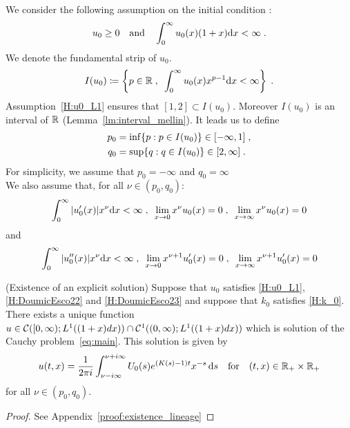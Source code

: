 \documentclass[11pt]{amsart}
\newcommand{\diff}{\,\mathrm{d}}
\begin{document}
    We consider the following assumption on the initial condition : 
    \begin{equation}
    u_0 \geq 0 \quad \text{and} \quad \int_0^\infty u_0(x) (1+x) \mathrm dx < \infty
    \; .
    \end{equation}
We denote the fundamental strip of $u_0$. 
\begin{equation}
    I(u_0) \coloneqq \left\{ p \in \mathbb{R} \; , \enspace \int_0^\infty u_0(x) x^{p-1} \mathrm dx < \infty \right\}
    \; .
\end{equation}
Assumption~\eqref{H:u0_L1} ensures that $[1, 2] \subset I(u_0)$. Moreover $I(u_0)$ is an interval of $\mathbb{R}$ (Lemma~\ref{lm:interval_mellin}). It leads us to define
\begin{subequations}
\begin{align*}
    p_0 &= \inf \{p : p \in I(u_0) \} \in [-\infty, 1] \; ,\\
    q_0 &= \sup \{q : q \in I(u_0) \} \in [2, \infty] \; .
\end{align*}    
\end{subequations}
For simplicity, we assume that 
$ p_0=-\infty$ and $q_0 = \infty$ \\

We also assume that, for all $\nu \in (p_0, q_0)$:
\begin{equation}
    \int_0^\infty |u_0'(x)| x^\nu \mathrm dx < \infty
    \; , \enspace
    \lim_{x \to 0} x^\nu u_0(x) = 0
    \; , \enspace
    \lim_{x \to \infty} x^\nu u_0(x) = 0
    \label{H:DoumicEsco22}
\end{equation}
and 
\begin{equation}
    \int_0^\infty |u_0''(x)| x^\nu \mathrm dx < \infty
    \; , \enspace
    \lim_{x \to 0} x^{\nu + 1} u_0'(x) = 0
    \; , \enspace
    \lim_{x \to \infty} x^{\nu + 1} u_0'(x) = 0
    \label{H:DoumicEsco23}
\end{equation}

\begin{theorem}(Existence of an explicit solution) 
    \label{t:existence_lineage}
    Suppose that  $u_0$ satisfies \eqref{H:u0_L1}, \eqref{H:DoumicEsco22} and \eqref{H:DoumicEsco23} and suppose that $k_0$ satisfies \eqref{H:k_0}. 
    There exists a unique function $u \in \mathcal{C}([0, \infty); L^1((1+x)dx)) \cap \mathcal{C}^1((0, \infty); L^1((1+x)dx))$ which is solution of the Cauchy problem~\eqref{eq:main}. This solution is given by 
    \begin{equation}
        \label{eq:explicit_reconstruction}
        u(t,x) = \frac{1}{2\pi i} \int_{\nu-i\infty}^{\nu+i\infty} U_0(s) e^{(K(s)-1)t}x^{-s} \diff s 
        \mtext{for} (t,x) \in \RR_+ \times \RR_+
    \end{equation}
    for all $\nu \in (p_0, q_0)$.
    \end{theorem}
    \begin{proof}
        See Appendix~\ref{proof:existence_lineage}
    \end{proof}
\end{document}
